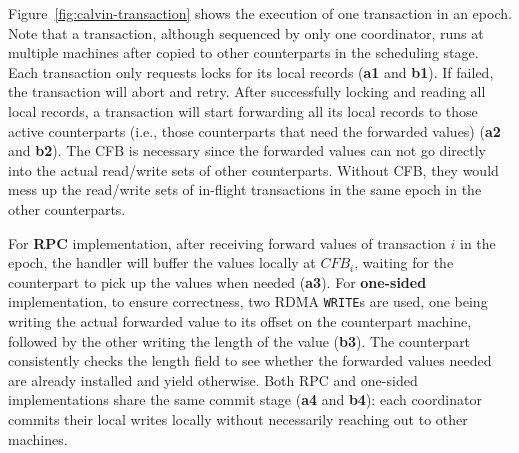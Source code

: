 Figure~\ref{fig:calvin-transaction} shows the execution of one transaction in an epoch. Note that a transaction, although sequenced by only one coordinator, runs at multiple machines after copied to other counterparts in the scheduling stage. Each transaction only requests locks for its local records (\step \textbf{a1} and \step \textbf{b1}). 
If failed, the transaction will abort and retry. 
After successfully locking and reading all local records, a transaction will start forwarding all its local records to those active counterparts (i.e., those counterparts that need the forwarded values) (\step \textbf{a2} and \step \textbf{b2}). The CFB is necessary since the forwarded values can not go directly into the actual read/write sets of other counterparts. Without CFB, they would mess up the read/write sets of in-flight transactions in the same epoch in the other counterparts.

For {\bf RPC} implementation, after receiving forward values of transaction $i$ in the epoch, the handler will buffer the values locally at $CFB_{i}$, waiting for the counterpart to pick up the values when needed (\step \textbf{a3}). For {\bf one-sided} implementation, to ensure correctness, two RDMA \texttt{WRITE}s are used, one being writing the actual forwarded value to its offset on the counterpart machine, followed by the other writing the length of the value (\step \textbf{b3}). The counterpart consistently checks the length field to see whether the forwarded values needed are already installed and yield otherwise. Both RPC and one-sided implementations share the same commit stage (\step \textbf{a4} and \step \textbf{b4}): each coordinator commits their local writes locally without necessarily reaching out to other machines.



